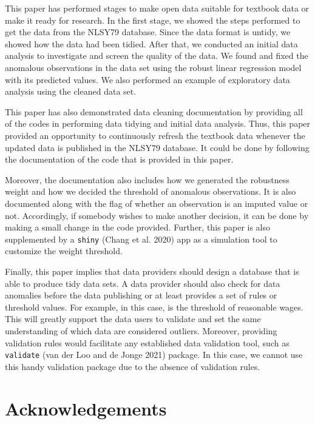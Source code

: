 \documentclass{article}
\begin{document}
This paper has performed stages to make open data suitable for textbook data or make it ready for research. In the first stage, we showed the steps performed to get the data from the NLSY79 database. Since the data format is untidy, we showed how the data had been tidied. After that, we conducted an initial data analysis to investigate and screen the quality of the data. We found and fixed the anomalous observations in the data set using the robust linear regression model with its predicted values. We also performed an example of exploratory data analysis using the cleaned data set.

This paper has also demonstrated data cleaning documentation by providing all of the codes in performing data tidying and initial data analysis. Thus, this paper provided an opportunity to continuously refresh the textbook data whenever the updated data is published in the NLSY79 database. It could be done by following the documentation of the code that is provided in this paper.

Moreover, the documentation also includes how we generated the robustness weight and how we decided the threshold of anomalous observations. It is also documented along with the flag of whether an observation is an imputed value or not. Accordingly, if somebody wishes to make another decision, it can be done by making a small change in the code provided. Further, this paper is also supplemented by a \texttt{shiny} (Chang et al. 2020) app as a simulation tool to customize the weight threshold.

Finally, this paper implies that data providers should design a database that is able to produce tidy data sets. A data provider should also check for data anomalies before the data publishing or at least provides a set of rules or threshold values. For example, in this case, is the threshold of reasonable wages. This will greatly support the data users to validate and set the same understanding of which data are considered outliers. Moreover, providing validation rules would facilitate any established data validation tool, such as \texttt{validate} (van der Loo and de Jonge 2021) package. In this case, we cannot use this handy validation package due to the absence of validation rules.

\hypertarget{acknowledgements}{%
\section{Acknowledgements}\label{acknowledgements}}
\end{document}
